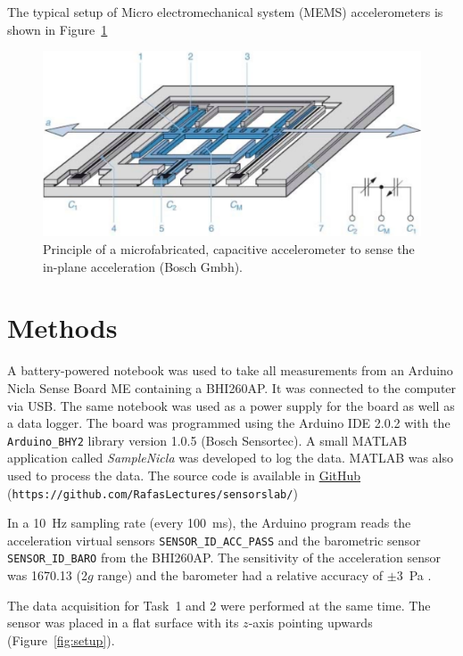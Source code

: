 \documentclass[DIV=14]{scrartcl}
\begin{document}
    The typical setup of Micro electromechanical system (MEMS) accelerometers is shown in Figure~\ref{fig:accelerometer}
    \begin{figure}[h]
        \centering
        \includegraphics[width=.6\textwidth]{figures/accelerometer}
        \caption{Principle of a microfabricated, capacitive accelerometer to sense the in-plane acceleration (Bosch Gmbh).}
        \label{fig:accelerometer}
    \end{figure}

    \clearpage


    \section{Methods}
    A battery-powered notebook was used to take all measurements from an Arduino Nicla Sense Board ME containing a BHI260AP.
    It was connected to the computer via USB.
    The same notebook was used as a power supply for the board as well as a data logger.
    The board was programmed using the Arduino IDE 2.0.2 with the \texttt{Arduino\_BHY2} library version 1.0.5 (Bosch Sensortec).
    A small MATLAB application called \textit{SampleNicla} was developed to log the data.
    MATLAB was also used to process the data.
    The source code is available in \href{https://github.com/RafasLectures/sensorslab/blob/main/SampleNicla.mlapp}{GitHub}
    (\texttt{https://github.com/RafasLectures/sensorslab/})

    In a \SI{10}{\hertz} sampling rate (every \SI{100}{\milli\second}), the Arduino program reads the acceleration
    virtual sensors \texttt{SENSOR\_ID\_ACC\_PASS} and the barometric sensor
    \texttt{SENSOR\_ID\_BARO} from the BHI260AP.
    The sensitivity of the acceleration sensor was \SI{1670.13}{} (2$g$ range) and the
    barometer had a relative accuracy of $\pm$\SI{3}{\pascal} \cite{BHI260}.

    The data acquisition for Task~1 and 2 were performed at the same time.
    The sensor was placed in a flat surface with its $z$-axis pointing upwards (Figure~\ref{fig:setup}).
\end{document}
